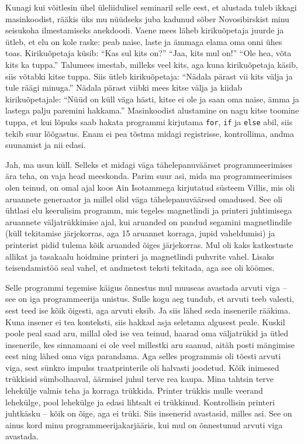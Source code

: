 Kunagi kui võitlesin ühel üleliidulisel 
seminaril selle eest, et alustada tuleb ikkagi masinkoodist, rääkis üks mu nüüdseks 
juba kadunud sõber Novosibirskist minu seisukoha 
ilmestamiseks anekdoodi. Vaene mees läheb 
kirikuõpetaja juurde ja ütleb, et elu on kole raske: peab naise, laste ja ämmaga
elama oma onni ühes toas. Kirikuõpetaja 
küsib: \enquote{Kas sul kits on?} \enquote{Jaa, kits mul on!} \enquote{Ole hea, võta kits ka tuppa.} Talumees imestab, milleks veel kits, aga kuna kirikuõpetaja käsib, siis võtabki 
kitse tuppa. Siis ütleb kirikuõpetaja: \enquote{Nädala pärast vii kits välja 
ja tule räägi minuga.} Nädala pärast viibki mees kitse välja ja kiidab kirikuõpetajale:
\enquote{Nüüd on küll väga hästi, kitse ei ole ja saan oma naise, ämma ja lastega palju paremini hakkama.} Masinkoodist alustamine on 
nagu kitse toomine tuppa, et kui lõpuks saab hakata programmi kirjutama 
\verb|for|, \verb|if| ja \verb|else| abil, siis tekib suur lõõgastus. Enam ei pea 
tõstma midagi registrisse, kontrollima, andma suunamist ja nii edasi. 


Jah, ma usun küll. Selleks et midagi väga tähelepanuväärset programmeerimises ära teha, on vaja 
head meeskonda. Parim suur asi, mida ma
programmeerimises olen teinud, on omal ajal koos Ain Isotammega kirjutatud süsteem Villis, mis oli aruannete 
generaator ja millel olid väga tähelepanuväärsed omadused. See oli ühtlasi elu 
keerulisim programm, mis tegeles magnetlindi ja printeri juhtimisega 
aruannete väljatrükkimise ajal, kui aruanded on pandud segamini magnetlindile (küll tekitamise järjekorras, aga 15 aruannet korraga, jupid vaheldumisi) 
ja printerist pidid tulema kõik aruanded õiges järjekorras. Mul oli kaks 
katkestuste allikat ja tasakaalu hoidmine printeri ja magnetlindi 
puhvrite vahel. Lisaks teisendamistöö seal vahel, et andmetest teksti 
tekitada, aga see oli köömes. 

Selle programmi tegemise käigus õnnestus mul 
muuseas avastada arvuti viga -- see on iga programmeerija unistus. Sulle kogu 
aeg tundub, et arvuti teeb valesti, sest teed ise kõik õigesti, 
aga arvuti eksib. Ja siis lähed seda insenerile rääkima. Kuna 
insener ei tea konteksti, siis hakkad asja seletama
algusest peale. Kuskil poole peal saad aru, millal oled ise vea teinud, haarad oma väljatrükid ja 
ütled insenerile, kes sinnamaani ei ole veel millestki aru saanud, aitäh 
posti mängimise eest ning lähed oma viga parandama. Aga selles programmis oli tõesti
arvuti viga, sest sünkro impulss traatprinterile oli 
halvasti joodetud. Kõik inimesed trükkisid sümbolhaaval, äärmisel 
juhul terve rea kaupa. Mina tahtsin terve lehekülje valmis teha ja
korraga trükkida. Printer trükkis mulle veerand lehekülge, pool 
lehekülge ja edasi lihtsalt ei trükkinud. Kontrollisin printeri juhtkäsku -- 
kõik on õige, aga ei trüki. Siis insenerid avastasid, 
milles asi. See on ainus kord minu programmeerijakarjääris, kui mul on õnnestunud 
arvuti viga avastada. 

